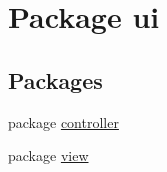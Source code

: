 \hypertarget{namespaceui}{}\section{Package ui}
\label{namespaceui}
\subsection*{Packages}
\begin{DoxyCompactItemize}
\item 
package \mbox{\hyperlink{namespaceui_1_1controller}{controller}}
\item 
package \mbox{\hyperlink{namespaceui_1_1view}{view}}
\end{DoxyCompactItemize}
